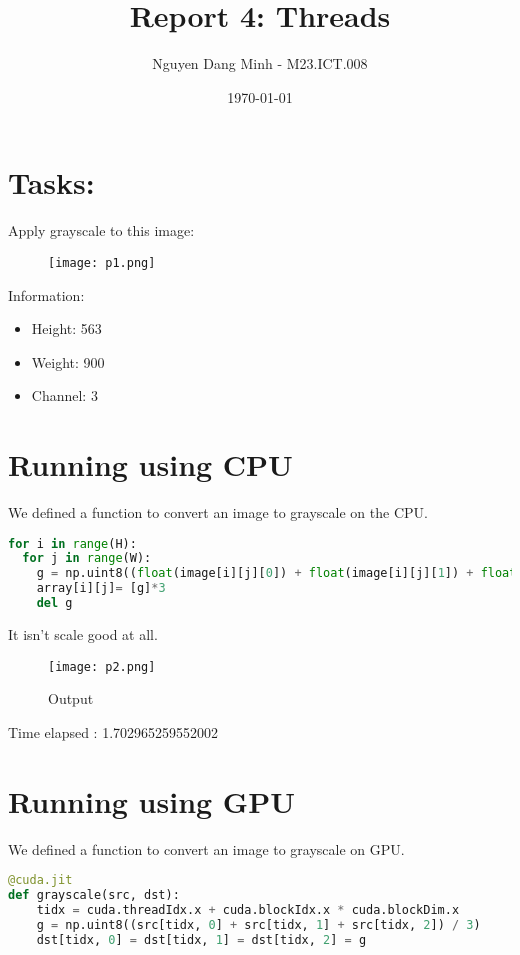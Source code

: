 \documentclass{article}
\title{Report 4: Threads}
\author{Nguyen Dang Minh - M23.ICT.008}
\date{\today}
\begin{document}
\maketitle
\section{Tasks:}

Apply grayscale to this image:

\begin{figure}[H]
    \centering
    \texttt{[image: p1.png]}
\end{figure} 
Information: 
\begin{itemize}
    \item Height: 563
    \item Weight: 900
    \item Channel: 3
\end{itemize}


\section{Running using CPU}


We defined a function to convert an image to grayscale on the CPU. 
\begin{lstlisting}[language=Python]
for i in range(H):
  for j in range(W):
    g = np.uint8((float(image[i][j][0]) + float(image[i][j][1]) + float(image[i][j][2])) // 3)
    array[i][j]= [g]*3
    del g
\end{lstlisting}
It isn't scale good at all.

\begin{figure}[H]
    \centering
    \texttt{[image: p2.png]}
    \caption{Output}
    \label{fig:enter-label}
\end{figure}


Time elapsed :   1.702965259552002

\section{Running using GPU}

We defined a function to convert an image to grayscale on GPU.
\begin{lstlisting}[language=Python]
@cuda.jit
def grayscale(src, dst):
    tidx = cuda.threadIdx.x + cuda.blockIdx.x * cuda.blockDim.x
    g = np.uint8((src[tidx, 0] + src[tidx, 1] + src[tidx, 2]) / 3)
    dst[tidx, 0] = dst[tidx, 1] = dst[tidx, 2] = g
\end{lstlisting}
\end{document}
